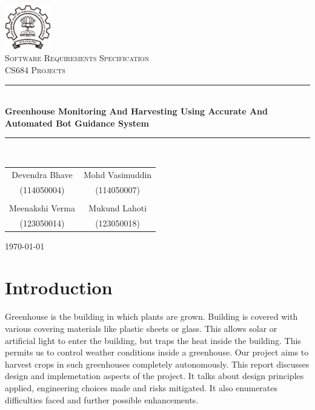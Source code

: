 \documentclass[a4paper, 12pt]{article}
\begin{document}
\begin{titlepage}
 \centering
 \includegraphics[width=0.15\textwidth]{./iitblogo}\\[1.5cm]
 \textsc{\LARGE Software Requirements Specification}\\[1.5cm]
 \textsc{\Large CS684 Projects} \\ [1.5cm]
 \rule{\linewidth}{0.5mm} \\ [0.5cm]
 {\LARGE \textbf{Greenhouse Monitoring And Harvesting Using Accurate And Automated Bot Guidance System}}
 \rule{\linewidth}{0.5mm}
 \\ [1.5cm]

 \large
 \begin{tabular}{cc}
  Devendra Bhave & Mohd Vasimuddin\\
  (114050004) & (114050007)\\
  \\
  Meenakshi Verma & Mukund Lahoti\\
  (123050014) & (123050018)
 \end{tabular}

 \vspace{2cm}
 \today
\end{titlepage}

\tableofcontents

\newpage

\section{Introduction}
Greenhouse is the building in which plants are grown. Building is covered with various covering materials like
plastic sheets or glass. This allows solar or artificial light to enter the building, but traps the heat inside
the building. This permits us to control weather conditions inside a greenhouse. Our project aims to
harvest crops in such greenhouses completely autonomously. This report discusses design and implemetation aspects of
the project. It talks about design principles applied, engineering choices made and risks mitigated. It also 
enumerates difficulties faced and further possible enhancements.
\end{document}
